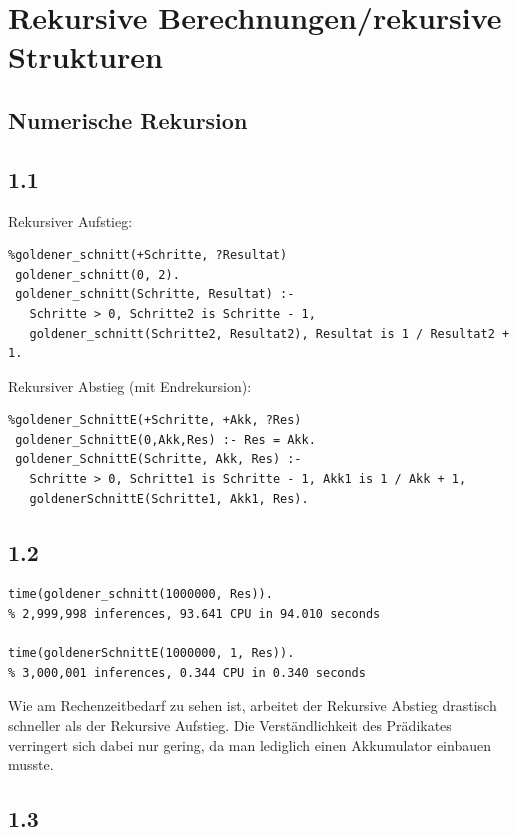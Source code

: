\documentclass[a4paper, 11pt]{article}
\begin{document}
\setcounter{section}{5}
\section{Rekursive Berechnungen/rekursive Strukturen}
\subsection{Numerische Rekursion}
\subsection*{1.1}

Rekursiver Aufstieg:

\begin{verbatim}
%goldener_schnitt(+Schritte, ?Resultat)
 goldener_schnitt(0, 2).
 goldener_schnitt(Schritte, Resultat) :- 
   Schritte > 0, Schritte2 is Schritte - 1,
   goldener_schnitt(Schritte2, Resultat2), Resultat is 1 / Resultat2 + 1.
\end{verbatim}

Rekursiver Abstieg (mit Endrekursion):

\begin{verbatim}
%goldener_SchnittE(+Schritte, +Akk, ?Res)
 goldener_SchnittE(0,Akk,Res) :- Res = Akk.
 goldener_SchnittE(Schritte, Akk, Res) :- 
   Schritte > 0, Schritte1 is Schritte - 1, Akk1 is 1 / Akk + 1, 
   goldenerSchnittE(Schritte1, Akk1, Res).
\end{verbatim}

\subsection*{1.2}

\begin{verbatim}
time(goldener_schnitt(1000000, Res)).
% 2,999,998 inferences, 93.641 CPU in 94.010 seconds

time(goldenerSchnittE(1000000, 1, Res)).
% 3,000,001 inferences, 0.344 CPU in 0.340 seconds
\end{verbatim}

Wie am Rechenzeitbedarf zu sehen ist, arbeitet der Rekursive Abstieg drastisch schneller als der Rekursive Aufstieg. Die Verst\"andlichkeit des Pr\"adikates verringert sich dabei nur gering, da man lediglich einen Akkumulator einbauen musste.

\subsection*{1.3}
\end{document}
